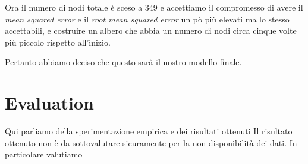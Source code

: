 \documentclass[a4paper, 11pt, oneside]{report}
\begin{document}
                \par \noindent Ora il numero di nodi totale è sceso a 349 e accettiamo il compromesso di avere il
                \textit{mean squared error} e il \textit{root mean squared error} un pò più elevati ma lo stesso accettabili,
                e costruire un albero che abbia un numero di nodi circa cinque volte più piccolo rispetto all'inizio.
                \par \noindent Pertanto abbiamo deciso che questo sarà il nostro modello finale.


    \section{Evaluation}
            Qui parliamo della sperimentazione empirica e dei risultati ottenuti
            Il risultato ottenuto non è da sottovalutare sicuramente per la non disponibilità dei dati.
            In particolare valutiamo
            \newpage
\end{document}
